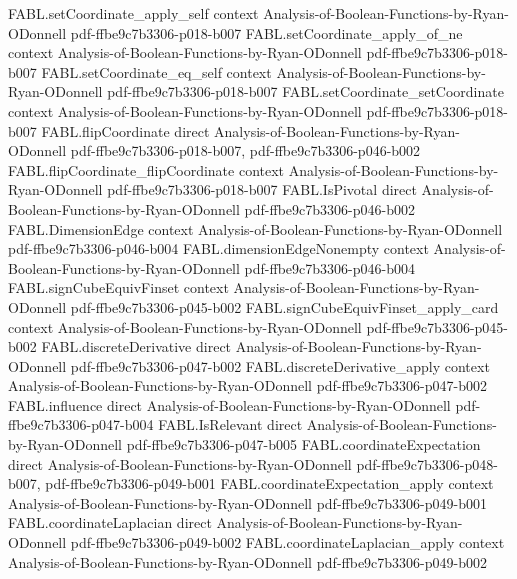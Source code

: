 \begin{theorem}
\proofstep
  {FABL.setCoordinate_apply_self}
  {context}
  {Analysis-of-Boolean-Functions-by-Ryan-ODonnell}
  {pdf-ffbe9c7b3306-p018-b007}
\proofstep
  {FABL.setCoordinate_apply_of_ne}
  {context}
  {Analysis-of-Boolean-Functions-by-Ryan-ODonnell}
  {pdf-ffbe9c7b3306-p018-b007}
\proofstep
  {FABL.setCoordinate_eq_self}
  {context}
  {Analysis-of-Boolean-Functions-by-Ryan-ODonnell}
  {pdf-ffbe9c7b3306-p018-b007}
\proofstep
  {FABL.setCoordinate_setCoordinate}
  {context}
  {Analysis-of-Boolean-Functions-by-Ryan-ODonnell}
  {pdf-ffbe9c7b3306-p018-b007}
\proofstep
  {FABL.flipCoordinate}
  {direct}
  {Analysis-of-Boolean-Functions-by-Ryan-ODonnell}
  {pdf-ffbe9c7b3306-p018-b007,
    pdf-ffbe9c7b3306-p046-b002}
\proofstep
  {FABL.flipCoordinate_flipCoordinate}
  {context}
  {Analysis-of-Boolean-Functions-by-Ryan-ODonnell}
  {pdf-ffbe9c7b3306-p018-b007}
\proofstep
  {FABL.IsPivotal}
  {direct}
  {Analysis-of-Boolean-Functions-by-Ryan-ODonnell}
  {pdf-ffbe9c7b3306-p046-b002}
\proofstep
  {FABL.DimensionEdge}
  {context}
  {Analysis-of-Boolean-Functions-by-Ryan-ODonnell}
  {pdf-ffbe9c7b3306-p046-b004}
\proofstep
  {FABL.dimensionEdgeNonempty}
  {context}
  {Analysis-of-Boolean-Functions-by-Ryan-ODonnell}
  {pdf-ffbe9c7b3306-p046-b004}
\proofstep
  {FABL.signCubeEquivFinset}
  {context}
  {Analysis-of-Boolean-Functions-by-Ryan-ODonnell}
  {pdf-ffbe9c7b3306-p045-b002}
\proofstep
  {FABL.signCubeEquivFinset_apply_card}
  {context}
  {Analysis-of-Boolean-Functions-by-Ryan-ODonnell}
  {pdf-ffbe9c7b3306-p045-b002}
\proofstep
  {FABL.discreteDerivative}
  {direct}
  {Analysis-of-Boolean-Functions-by-Ryan-ODonnell}
  {pdf-ffbe9c7b3306-p047-b002}
\proofstep
  {FABL.discreteDerivative_apply}
  {context}
  {Analysis-of-Boolean-Functions-by-Ryan-ODonnell}
  {pdf-ffbe9c7b3306-p047-b002}
\proofstep
  {FABL.influence}
  {direct}
  {Analysis-of-Boolean-Functions-by-Ryan-ODonnell}
  {pdf-ffbe9c7b3306-p047-b004}
\proofstep
  {FABL.IsRelevant}
  {direct}
  {Analysis-of-Boolean-Functions-by-Ryan-ODonnell}
  {pdf-ffbe9c7b3306-p047-b005}
\proofstep
  {FABL.coordinateExpectation}
  {direct}
  {Analysis-of-Boolean-Functions-by-Ryan-ODonnell}
  {pdf-ffbe9c7b3306-p048-b007,
    pdf-ffbe9c7b3306-p049-b001}
\proofstep
  {FABL.coordinateExpectation_apply}
  {context}
  {Analysis-of-Boolean-Functions-by-Ryan-ODonnell}
  {pdf-ffbe9c7b3306-p049-b001}
\proofstep
  {FABL.coordinateLaplacian}
  {direct}
  {Analysis-of-Boolean-Functions-by-Ryan-ODonnell}
  {pdf-ffbe9c7b3306-p049-b002}
\proofstep
  {FABL.coordinateLaplacian_apply}
  {context}
  {Analysis-of-Boolean-Functions-by-Ryan-ODonnell}
  {pdf-ffbe9c7b3306-p049-b002}

\end{theorem}
